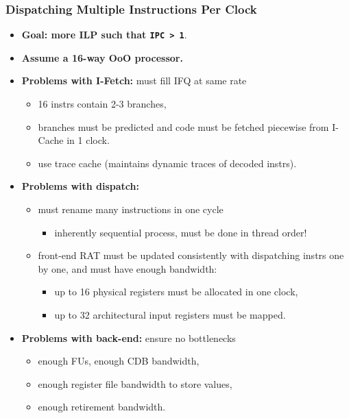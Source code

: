 \documentclass{beamer}
\newcommand{\emp}[1]{\textcolor{DikuRed}{ #1}}
\begin{document}
\begin{frame}[fragile]
	\tableofcontents[currentsection]
\end{frame}

\begin{frame}[fragile,t]
\frametitle{Dispatching Multiple Instructions Per Clock}

\begin{itemize}
\item \emp{\bf Goal: more ILP such that {\tt IPC > 1}}.

\item \emp{\bf Assume a 16-way OoO processor.}\medskip

\item \emp{\bf Problems with I-Fetch:} must fill IFQ at same rate
\begin{itemize}
    \item 16 instrs contain 2-3 branches,\pause
    \item branches must be predicted and code must be fetched
            piecewise from I-Cache in 1 clock.
    \item use trace cache (maintains dynamic traces of decoded instrs).
\end{itemize}\medskip

\item \emp{\bf Problems with dispatch:}
\begin{itemize}
    \item must rename many instructions in one cycle
    \begin{itemize}
        \item inherently sequential process, must be done in thread order!
    \end{itemize}
    \item front-end RAT must be updated consistently with dispatching instrs one by one,
            and must have enough bandwidth:
    \begin{itemize}
        \item up to 16 physical registers must be allocated in one clock,
        \item up to 32 architectural input registers must be mapped. 
    \end{itemize}
\end{itemize}\medskip

\item \emp{\bf Problems with back-end:} ensure no bottlenecks
\begin{itemize}
    \item enough FUs, enough CDB bandwidth,
    \item enough register file bandwidth to store values,
    \item enough retirement bandwidth. 
\end{itemize}
\end{itemize}

\end{frame}
\end{document}
